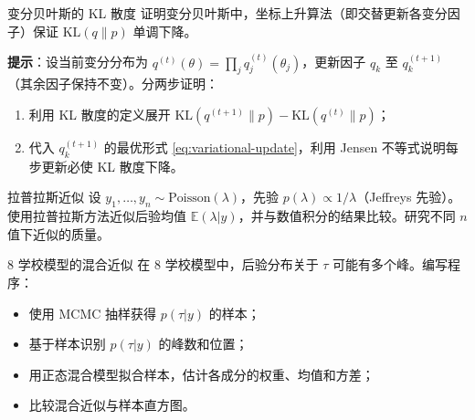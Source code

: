 \begin{Exercise}{变分贝叶斯的 KL 散度}\label{ex:vb-kl}
证明变分贝叶斯中，坐标上升算法（即交替更新各变分因子）保证 $\text{KL}(q\|p)$ 单调下降。

\textbf{提示}：设当前变分分布为 $q^{(t)}(\theta) = \prod_j q_j^{(t)}(\theta_j)$，更新因子 $q_k$ 至 $q_k^{(t+1)}$（其余因子保持不变）。分两步证明：
\begin{enumerate}
\item 利用 KL 散度的定义展开 $\text{KL}(q^{(t+1)}\|p) - \text{KL}(q^{(t)}\|p)$；
\item 代入 $q_k^{(t+1)}$ 的最优形式 \cref{eq:variational-update}，利用 Jensen 不等式说明每步更新必使 KL 散度下降。
\end{enumerate}
\end{Exercise}

\begin{Exercise}{拉普拉斯近似}\label{ex:laplace-approx}
设 $y_1, \ldots, y_n \sim \text{Poisson}(\lambda)$，先验 $p(\lambda) \propto 1/\lambda$（Jeffreys 先验）。使用拉普拉斯方法近似后验均值 $\mathbb{E}(\lambda|y)$，并与数值积分的结果比较。研究不同 $n$ 值下近似的质量。
\end{Exercise}

\begin{Exercise}{8 学校模型的混合近似}\label{ex:8schools-mixture}
在 8 学校模型中，后验分布关于 $\tau$ 可能有多个峰。编写程序：
\begin{itemize}
\item[(a)] 使用 MCMC 抽样获得 $p(\tau|y)$ 的样本；
\item[(b)] 基于样本识别 $p(\tau|y)$ 的峰数和位置；
\item[(c)] 用正态混合模型拟合样本，估计各成分的权重、均值和方差；
\item[(d)] 比较混合近似与样本直方图。
\end{itemize}
\end{Exercise}

\endinput
